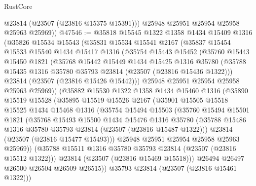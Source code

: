 \begin{lexlean}{RustCore}
\begin{coremodule}
          @23814
          (@23507 (@23816 @15375 @15391)))
        @25948
        @25951
        @25954
        @25958
        @25963
        @25969))
@47546 := @35818
    @15545
    @1322
    @1358
    @1434
    @15409
    @1316
    (@35826
      @15534
      @15543
      (@35831
        @15534
        @15541
        @2167
        (@35837
          @15454
          @15533
          @15540
          @1434
          @15417
          @1316
          (@35754
            @15443
            @15452
            (@35760
              @15443
              @15450
              @1821
              (@35768
                @15442
                @15449
                @1434
                @15425
                @1316
                @35780
                (@35788 @15435 @1316 @35780 @35793 @23814 (@23507 (@23816 @15436 @1322)))
                @23814
                (@23507 (@23816 @15426 @15442)))
              @25948
              @25951
              @25954
              @25958
              @25963
              @25969))
          (@35882
            @15530
            @1322
            @1358
            @1434
            @15460
            @1316
            (@35890
              @15519
              @15528
              (@35895
                @15519
                @15526
                @2167
                (@35901
                  @15505
                  @15518
                  @15525
                  @1434
                  @15468
                  @1316
                  (@35754
                    @15494
                    @15503
                    (@35760
                      @15494
                      @15501
                      @1821
                      (@35768
                        @15493
                        @15500
                        @1434
                        @15476
                        @1316
                        @35780
                        (@35788 @15486 @1316 @35780 @35793 @23814 (@23507 (@23816 @15487 @1322)))
                        @23814
                        (@23507 (@23816 @15477 @15493)))
                      @25948
                      @25951
                      @25954
                      @25958
                      @25963
                      @25969))
                  (@35788 @15511 @1316 @35780 @35793 @23814 (@23507 (@23816 @15512 @1322)))
                  @23814
                  (@23507 (@23816 @15469 @15518)))
                @26494
                @26497
                @26500
                @26504
                @26509
                @26515))
            @35793
            @23814
            (@23507 (@23816 @15461 @1322)))

\end{coremodule}
\end{lexlean}

